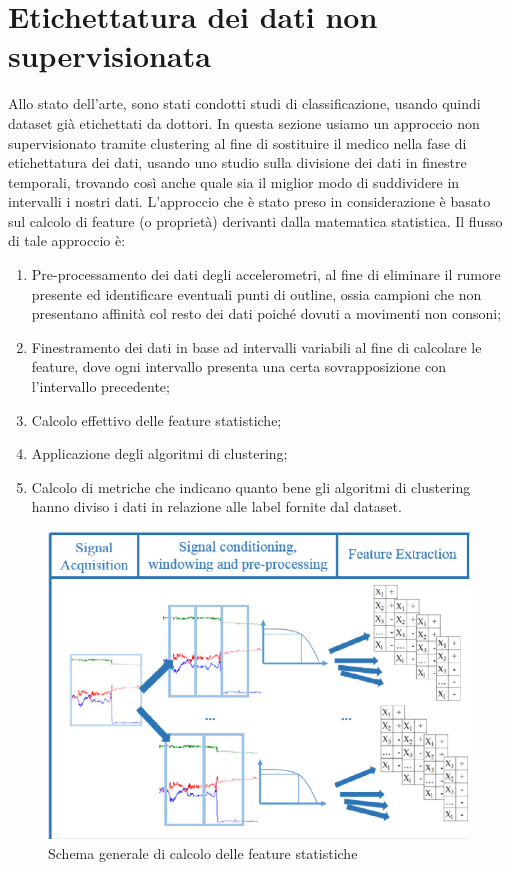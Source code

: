 \section{Etichettatura dei dati non supervisionata}
Allo stato dell'arte, sono stati condotti studi di classificazione, usando quindi dataset già etichettati da dottori. In questa sezione usiamo un approccio non supervisionato tramite clustering al fine di sostituire il medico nella fase di etichettatura dei dati, usando uno studio sulla divisione dei dati in finestre temporali, trovando così anche quale sia il miglior modo di suddividere in intervalli i nostri dati. L'approccio che è stato preso in considerazione è basato sul calcolo di feature (o proprietà) derivanti dalla matematica statistica. Il flusso di tale approccio è:
\begin{enumerate}
	\item Pre-processamento dei dati degli accelerometri, al fine di eliminare il rumore presente ed identificare eventuali punti di outline, ossia campioni che non presentano affinità col resto dei dati poiché dovuti a movimenti non consoni;
	\item Finestramento dei dati in base ad intervalli variabili al fine di calcolare le feature, dove ogni intervallo presenta una certa sovrapposizione con l'intervallo precedente;
	\item Calcolo effettivo delle feature statistiche;
	\item Applicazione degli algoritmi di clustering;
	\item Calcolo di metriche che indicano quanto bene gli algoritmi di clustering hanno diviso i dati in relazione alle label fornite dal dataset.
\end{enumerate}
\begin{figure}[h!]
	\centering
	\includegraphics[width=1\textwidth]{images/flusso_feature.png}
	\caption{Schema generale di calcolo delle feature statistiche}
	\label{Flusso Feature}
\end{figure}
